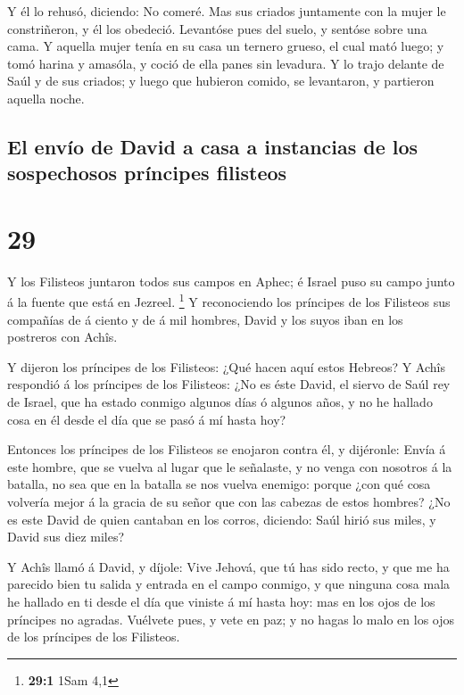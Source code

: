  Y él lo rehusó, diciendo: No comeré. Mas sus criados
juntamente con la mujer le constriñeron, y él los obedeció. Levantóse
pues del suelo, y sentóse sobre una cama.  Y aquella
mujer tenía en su casa un ternero grueso, el cual mató luego; y tomó
harina y amasóla, y coció de ella panes sin levadura.  Y
lo trajo delante de Saúl y de sus criados; y luego que hubieron comido,
se levantaron, y partieron aquella noche.

\hypertarget{el-envuxedo-de-david-a-casa-a-instancias-de-los-sospechosos-pruxedncipes-filisteos}{%
\subsection{El envío de David a casa a instancias de los sospechosos
príncipes
filisteos}\label{el-envuxedo-de-david-a-casa-a-instancias-de-los-sospechosos-pruxedncipes-filisteos}}

\hypertarget{section-28}{%
\section{29}\label{section-28}}

 Y los Filisteos juntaron todos sus campos en Aphec; é
Israel puso su campo junto á la fuente que está en Jezreel. \footnote{\textbf{29:1}
  1Sam 4,1}  Y reconociendo los príncipes de los Filisteos
sus compañías de á ciento y de á mil hombres, David y los suyos iban en
los postreros con Achîs.

 Y dijeron los príncipes de los Filisteos: ¿Qué hacen aquí
estos Hebreos? Y Achîs respondió á los príncipes de los Filisteos: ¿No
es éste David, el siervo de Saúl rey de Israel, que ha estado conmigo
algunos días ó algunos años, y no he hallado cosa en él desde el día que
se pasó á mí hasta hoy?

 Entonces los príncipes de los Filisteos se enojaron
contra él, y dijéronle: Envía á este hombre, que se vuelva al lugar que
le señalaste, y no venga con nosotros á la batalla, no sea que en la
batalla se nos vuelva enemigo: porque ¿con qué cosa volvería mejor á la
gracia de su señor que con las cabezas de estos hombres? 
¿No es este David de quien cantaban en los corros, diciendo: Saúl hirió
sus miles, y David sus diez miles?

 Y Achîs llamó á David, y díjole: Vive Jehová, que tú has
sido recto, y que me ha parecido bien tu salida y entrada en el campo
conmigo, y que ninguna cosa mala he hallado en ti desde el día que
viniste á mí hasta hoy: mas en los ojos de los príncipes no agradas.
 Vuélvete pues, y vete en paz; y no hagas lo malo en los
ojos de los príncipes de los Filisteos.

